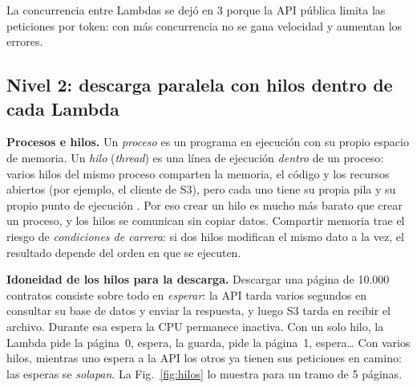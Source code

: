\documentclass[conference]{IEEEtran}
\begin{document}
La concurrencia entre Lambdas se dejó en 3 porque la API pública limita las peticiones por token: con más concurrencia no se gana velocidad y aumentan los errores.

\subsection{Nivel 2: descarga paralela con hilos dentro de cada Lambda}
\textbf{Procesos e hilos.} Un \emph{proceso} es un programa en ejecución con su propio espacio de memoria. Un \emph{hilo} (\textit{thread}) es una línea de ejecución \emph{dentro} de un proceso: varios hilos del mismo proceso comparten la memoria, el código y los recursos abiertos (por ejemplo, el cliente de S3), pero cada uno tiene su propia pila y su propio punto de ejecución \cite{grama2003}. Por eso crear un hilo es mucho más barato que crear un proceso, y los hilos se comunican sin copiar datos. Compartir memoria trae el riesgo de \emph{condiciones de carrera}: si dos hilos modifican el mismo dato a la vez, el resultado depende del orden en que se ejecuten.

\textbf{Idoneidad de los hilos para la descarga.} Descargar una página de 10.000 contratos consiste sobre todo en \emph{esperar}: la API tarda varios segundos en consultar su base de datos y enviar la respuesta, y luego S3 tarda en recibir el archivo. Durante esa espera la CPU permanece inactiva. Con un solo hilo, la Lambda pide la página~0, espera, la guarda, pide la página~1, espera\ldots{} Con varios hilos, mientras uno espera a la API los otros ya tienen sus peticiones en camino: las esperas se \emph{solapan}. La Fig.~\ref{fig:hilos} lo muestra para un tramo de 5 páginas.
\end{document}
